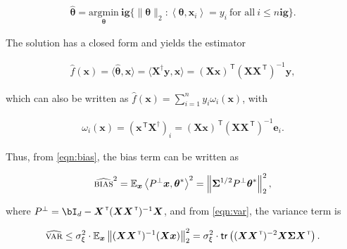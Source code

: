 \begin{align}\label{eq:minnormlin}
	\widehat{{\boldsymbol \theta}} = \underset{{\boldsymbol \theta}}{\mathrm{argmin}} \  \mathbf{ig}\{ \| {\boldsymbol \theta} \|_2: \left\langle {\boldsymbol \theta},{\boldsymbol x}_i \right\rangle = y_i ~\text{for all}~ i \leq n \mathbf{ig}\}.
\end{align}

The solution has a closed form and yields the estimator

\begin{align}
	\label{eq:def_linear_reg}
	\widehat{f}({\boldsymbol x}) = \langle \widehat{{\boldsymbol \theta}}, {\boldsymbol x} \rangle = \langle {\boldsymbol X}^\dagger {\boldsymbol y}, {\boldsymbol x} \rangle

	= ({\boldsymbol X} {\boldsymbol x})^\ensuremath{{\scriptscriptstyle\mathsf{\,T}}} ({\boldsymbol X}{\boldsymbol X}^\ensuremath{{\scriptscriptstyle\mathsf{\,T}}})^{-1} {\boldsymbol y},
\end{align}

	
which can also be written as $\widehat{f}({\boldsymbol x}) = \sum_{i=1}^n y_i
\omega_i({\boldsymbol x})$, with

\begin{align}
	\omega_i({\boldsymbol x}) = ({\boldsymbol x}^\ensuremath{{\scriptscriptstyle\mathsf{\,T}}} {\boldsymbol X}^\dagger)_i = ({\boldsymbol X} {\boldsymbol x})^\ensuremath{{\scriptscriptstyle\mathsf{\,T}}} ({\boldsymbol X}{\boldsymbol X}^\ensuremath{{\scriptscriptstyle\mathsf{\,T}}})^{-1} {\boldsymbol e}_i.
\end{align}

	
Thus, from \eqref{eqn:bias}, the bias term can be written as

\begin{align}
	\label{eq:bias_linear_emp}
	{\widehat{\textsc{bias}}^2} = \mathbb{E}_{\boldsymbol x} \left\langle P^\perp {\boldsymbol x},{\boldsymbol \theta}^* \right\rangle^2 = \left\| {\boldsymbol \Sigma}^{1/2} P^{\perp} {\boldsymbol \theta}^*\right\|^2_2,
\end{align}

where $P^\perp = \bI_d - {\boldsymbol X}^\ensuremath{{\scriptscriptstyle\mathsf{\,T}}} ({\boldsymbol X}{\boldsymbol X}^\ensuremath{{\scriptscriptstyle\mathsf{\,T}}})^{-1}{\boldsymbol X}$, and from \eqref{eqn:var}, the variance term is

\begin{align}
	\label{eq:var_linear}
	{\widehat{\textsc{var}}} \leq \sigma^2_\xi \cdot \mathbb{E}_{\boldsymbol x}\left\|({\boldsymbol X}{\boldsymbol X}^\ensuremath{{\scriptscriptstyle\mathsf{\,T}}})^{-1} ({\boldsymbol X} {\boldsymbol x})\right\|^2_2 = \sigma^2_\xi \cdot \mathsf{tr}\left(({\boldsymbol X}{\boldsymbol X}^\ensuremath{{\scriptscriptstyle\mathsf{\,T}}})^{-2} {\boldsymbol X} {\boldsymbol \Sigma} {\boldsymbol X}^\ensuremath{{\scriptscriptstyle\mathsf{\,T}}} \right).
\end{align}

